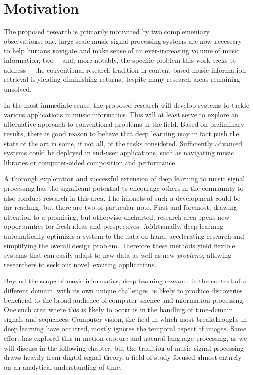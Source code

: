 \section{Motivation}


The proposed research is primarily motivated by two complementary observations:
one, large scale music signal processing systems are now necessary to help humans navigate and make sense of an ever-increasing volume of music information;
two ---and, more notably, the specific problem this work seeks to address--- the conventional research tradition in content-based music information retrieval is yielding diminishing returns, despite many research areas remaining unsolved.

In the most immediate sense, the proposed research will develop systems to tackle various applications in music informatics.
This will at least serve to explore an alternative approach to conventional problems in the field.
Based on preliminary results, there is good reason to believe that deep learning may in fact push the state of the art in some, if not all, of the tasks considered.
Sufficiently advanced systems could be deployed in end-user applications, such as navigating music libraries or computer-aided composition and performance.

A thorough exploration and successful extension of deep learning to music signal processing has the significant potential to encourage others in the community to also conduct research in this area.
The impacts of such a development could be far reaching, but there are two of particular note.
First and foremost, drawing attention to a promising, but otherwise uncharted, research area opens new opportunities for fresh ideas and perspectives.
Additionally, deep learning automatically optimizes a system to the data on hand, accelerating research and simplifying the overall design problem.
Therefore these methods yield flexible systems that can easily adapt to new data as well as new \emph{problems}, allowing researchers to seek out novel, exciting applications.

Beyond the scope of music informatics, deep learning research in the context of a different domain, with its own unique challenges, is likely to produce discoveries beneficial to the broad audience of computer science and information processing.
One such area where this is likely to occur is in the handling of time-domain signals and sequences.
Computer vision, the field in which most breakthroughs in deep learning have occurred, mostly ignores the temporal aspect of images.
Some effort has explored this in motion capture and natural language processing, as we will discuss in the following chapter, but the tradition of music signal processing draws heavily from digital signal theory, a field of study focused almost entirely on an analytical understanding of time.

